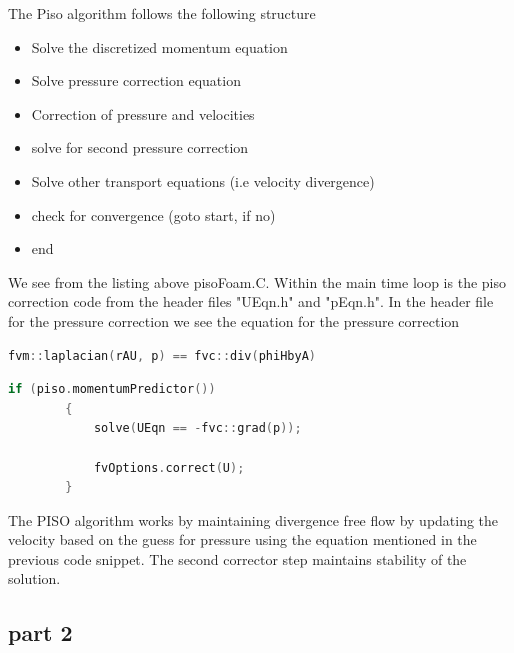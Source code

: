 \documentclass[paper=a4, fontsize=11pt]{article} %
\numberwithin{equation}{section} %
\numberwithin{figure}{section} %
\numberwithin{table}{section} %
\begin{document}
    \clearpage
    
    The Piso algorithm follows the following structure

    \begin{itemize}
        \item Solve the discretized momentum equation
        \item Solve pressure correction equation
        \item Correction of pressure and velocities
        \item solve for second pressure correction
        \item Solve other transport equations (i.e velocity divergence)
        \item check for convergence (goto start, if no)
        \item end
    \end{itemize}
    
    We see from the listing above pisoFoam.C. Within the main time loop is the piso correction code from the header files "UEqn.h" and "pEqn.h". In the header file for the pressure correction we see the equation for the pressure correction  

    \begin{lstlisting}[language = C++]
        fvm::laplacian(rAU, p) == fvc::div(phiHbyA) 
    \end{lstlisting}



    \begin{lstlisting}[language = C++]
        if (piso.momentumPredictor())
        {
            solve(UEqn == -fvc::grad(p));

            fvOptions.correct(U);
        }
    \end{lstlisting}


    The PISO algorithm works by maintaining divergence free flow by updating the velocity based on the guess for pressure using the equation mentioned in the previous code snippet.  The second corrector step maintains stability of the solution.

    \clearpage
    \subsection*{part 2}
\end{document}
